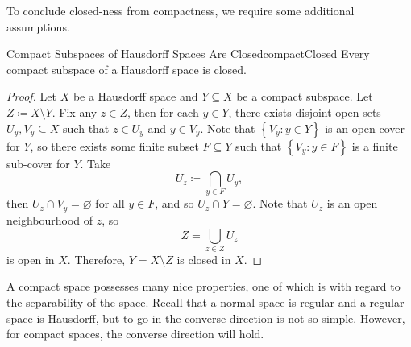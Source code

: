\documentclass[math]{amznotes}
\theoremstyle{remark}
\begin{document}
To conclude closed-ness from compactness, we require some additional assumptions.
\begin{probox}{Compact Subspaces of Hausdorff Spaces Are Closed}{compactClosed}
    Every compact subspace of a Hausdorff space is closed.
    \tcblower
    \begin{proof}
        Let $X$ be a Hausdorff space and $Y \subseteq X$ be a compact subspace. Let~$Z \coloneqq X \setminus Y$. Fix any $z \in Z$, then for each $y \in Y$, there exists disjoint open sets $U_y, V_y \subseteq X$ such that $z \in U_y$ and $y \in V_y$. Note that $\left\{V_y \colon y \in Y\right\}$ is an open cover for $Y$, so there exists some finite subset $F \subseteq Y$ such that $\left\{V_y \colon y \in F\right\}$ is a finite sub-cover for $Y$. Take 
        \begin{equation*}
            U_z \coloneqq \bigcap_{y \in F}U_y,
        \end{equation*}
        then $U_z \cap V_y = \varnothing$ for all $y \in F$, and so $U_z \cap Y = \varnothing$. Note that $U_z$ is an open neighbourhood of $z$, so
        \begin{equation*}
            Z = \bigcup_{z \in Z}U_z
        \end{equation*}
        is open in $X$. Therefore, $Y = X \setminus Z$ is closed in $X$.
    \end{proof}
\end{probox}
A compact space possesses many nice properties, one of which is with regard to the separability of the space. Recall that a normal space is regular and a regular space is Hausdorff, but to go in the converse direction is not so simple. However, for compact spaces, the converse direction will hold.
\end{document}

